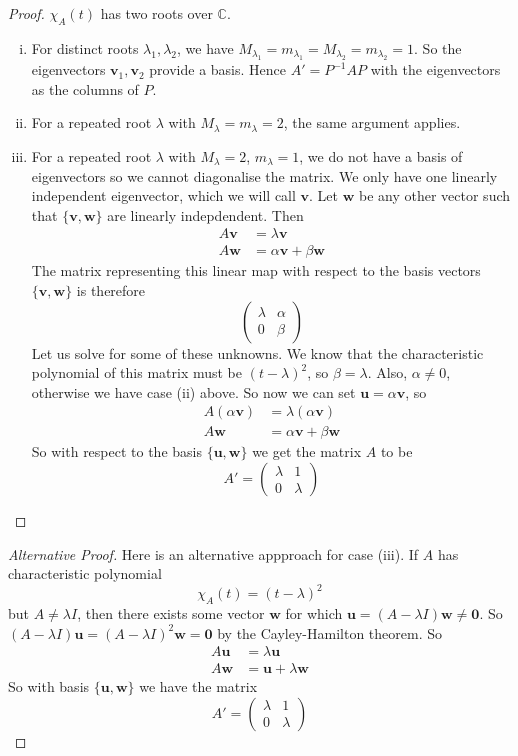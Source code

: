 \documentclass{article}
\begin{document}
	\begin{proof}
		$\chi_A(t)$ has two roots over $\mathbb C$.
		\begin{enumerate}[(i)]
			\item For distinct roots $\lambda_1, \lambda_2$, we have $M_{\lambda_1} = m_{\lambda_1} = M_{\lambda_2} = m_{\lambda_2} = 1$. So the eigenvectors $\bm v_1, \bm v_2$ provide a basis. Hence $A' = P^{-1}AP$ with the eigenvectors as the columns of $P$.
			\item For a repeated root $\lambda$ with $M_\lambda = m_\lambda = 2$, the same argument applies.
			\item For a repeated root $\lambda$ with $M_\lambda = 2$, $m_\lambda = 1$, we do not have a basis of eigenvectors so we cannot diagonalise the matrix. We only have one linearly independent eigenvector, which we will call $\bm v$. Let $\bm w$ be any other vector such that $\{ \bm v, \bm w \}$ are linearly indepdendent. Then
			\begin{align*}
				A\bm v &= \lambda \bm v \\
				A\bm w &= \alpha \bm v + \beta \bm w
			\end{align*}
			The matrix representing this linear map with respect to the basis vectors $\{ \bm v, \bm w \}$ is therefore
			\[ \begin{pmatrix}
				\lambda & \alpha \\
				0 & \beta
			\end{pmatrix} \]
			Let us solve for some of these unknowns. We know that the characteristic polynomial of this matrix must be $(t - \lambda)^2$, so $\beta = \lambda$. Also, $\alpha \neq 0$, otherwise we have case (ii) above. So now we can set $\bm u = \alpha \bm v$, so
			\begin{align*}
				A(\alpha \bm v) &= \lambda (\alpha \bm v) \\
				A\bm w &= \alpha \bm v + \beta \bm w
			\end{align*}
			So with respect to the basis $\{ \bm u, \bm w \}$ we get the matrix $A$ to be
			\[ A' = \begin{pmatrix}
				\lambda & 1 \\
				0 & \lambda
			\end{pmatrix} \]
		\end{enumerate}
	\end{proof}
	\begin{proof}[Alternative Proof]
		Here is an alternative appproach for case (iii). If $A$ has characteristic polynomial
		\[ \chi_A(t) = (t - \lambda)^2 \]
		but $A \neq \lambda I$, then there exists some vector $\bm w$ for which $\bm u = (A - \lambda I)\bm w \neq \bm 0$. So $(A - \lambda I)\bm u = (A - \lambda I)^2 \bm w  = \bm 0$ by the Cayley-Hamilton theorem. So
		\begin{align*}
			A\bm u &= \lambda \bm u \\
			A\bm w &= \bm u + \lambda \bm w
		\end{align*}
		So with basis $\{ \bm u, \bm w \}$ we have the matrix
		\[ A' = \begin{pmatrix}
			\lambda & 1 \\
			0 & \lambda
		\end{pmatrix} \]
	\end{proof}
\end{document}
